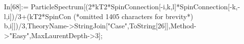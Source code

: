 In[68]:= ParticleSpectrum[(2*kT2*SpinConnection[-i,k,l]*SpinConnection[-k,-l,i])/3+(kT2*SpinCon (*omitted 1405 characters for brevity*) b,i]])/3,TheoryName->StringJoin["Case",ToString[26]],Method->"Easy",MaxLaurentDepth->3];